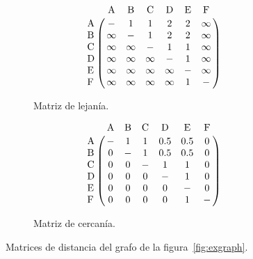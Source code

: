 \begin{figure}[htpb]
  \centering
  \begin{subfigure}[b]{.4\textwidth}
    \begin{equation*}
      \bordermatrix{
         ~  &   $A$  &   $B$  &   $C$  &   $D$  &   $E$  &   $F$  \cr
        $A$ & -      & 1      & 1      & 2      & 2      & \infty \cr
        $B$ & \infty & -      & 1      & 2      & 2      & \infty \cr
        $C$ & \infty & \infty & -      & 1      & 1      & \infty \cr
        $D$ & \infty & \infty & \infty & -      & 1      & \infty \cr
        $E$ & \infty & \infty & \infty & \infty & -      & \infty \cr
        $F$ & \infty & \infty & \infty & \infty & 1      & -      \cr
      }
    \end{equation*}
    \caption{Matriz de lejanía.}
    \label{fig:closs:lej}
  \end{subfigure}
  \begin{subfigure}[b]{.4\textwidth}
    \begin{equation*}
      \bordermatrix{
       ~  & $A$ & $B$ & $C$ & $D$ & $E$ & $F$ \cr
      $A$ &  -  &  1  &  1  & 0.5 & 0.5 &  0  \cr
      $B$ &  0  &  -  &  1  & 0.5 & 0.5 &  0  \cr
      $C$ &  0  &  0  &  -  &  1  &  1  &  0  \cr
      $D$ &  0  &  0  &  0  &  -  &  1  &  0  \cr
      $E$ &  0  &  0  &  0  &  0  &  -  &  0  \cr
      $F$ &  0  &  0  &  0  &  0  &  1  &  -  \cr
    }
    \end{equation*}
    \caption{Matriz de cercanía.}
    \label{fig:closs:cer}
  \end{subfigure}
  \caption{Matrices de distancia del grafo de la figura~\ref{fig:exgraph}.}
  \label{fig:closs}
\end{figure}
